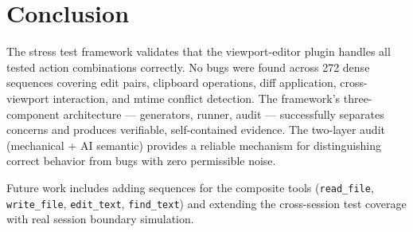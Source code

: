 \documentclass{article}
\begin{document}
\section{Conclusion}
\label{sec:conclusion}

The stress test framework validates that the viewport-editor plugin handles all
tested action combinations correctly. No bugs were found across 272 dense
sequences covering edit pairs, clipboard operations, diff application,
cross-viewport interaction, and mtime conflict detection. The framework's
three-component architecture --- generators, runner, audit --- successfully
separates concerns and produces verifiable, self-contained evidence. The
two-layer audit (mechanical + AI semantic) provides a reliable mechanism for
distinguishing correct behavior from bugs with zero permissible noise.

Future work includes adding sequences for the composite tools (\texttt{read\_file},
\texttt{write\_file}, \texttt{edit\_text}, \texttt{find\_text}) and extending
the cross-session test coverage with real session boundary simulation.



\end{document}
